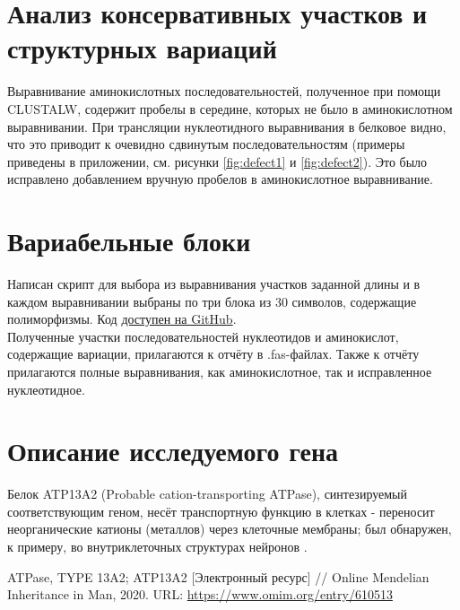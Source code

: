 \documentclass[a4paper,12pt]{article} %
\begin{document}
	\section{Анализ консервативных участков и структурных вариаций}
	Выравнивание аминокислотных последовательностей, полученное при помощи CLUSTALW, содержит пробелы в середине, которых не было в аминокислотном выравнивании. При трансляции нуклеотидного выравнивания в белковое видно, что это приводит к очевидно сдвинутым последовательностям (примеры приведены в приложении, см. рисунки \ref{fig:defect1} и \ref{fig:defect2}). Это было исправлено добавлением вручную пробелов в аминокислотное выравнивание.
	
	\section{Вариабельные блоки}
	Написан скрипт для выбора из выравнивания участков заданной длины и в каждом выравнивании выбраны по три блока из 30 символов, содержащие полиморфизмы. Код \href{https://github.com/zuevval/source/blob/master/python/bioinf_practice/needles/random_subalignment.py}{доступен на GitHub}.\\
	Полученные участки последовательностей нуклеотидов и аминокислот, содержащие вариации, прилагаются к отчёту в .fas-файлах. Также к отчёту прилагаются полные выравнивания, как аминокислотное, так и исправленное нуклеотидное.
	\section{Описание исследуемого гена}
	Белок ATP13A2 (Probable cation-transporting ATPase), синтезируемый соответствующим геном, несёт транспортную функцию в клетках - переносит неорганические катионы (металлов) через клеточные мембраны; был обнаружен, к примеру, во внутриклеточных структурах нейронов \cite{omim}.
	\begin{thebibliography}{99}
		 ATPase, TYPE 13A2; ATP13A2 [Электронный ресурс] // Online Mendelian Inheritance in Man, 2020. URL: \url{https://www.omim.org/entry/610513}
	\end{thebibliography}

	\newpage
			
		
\end{document}
